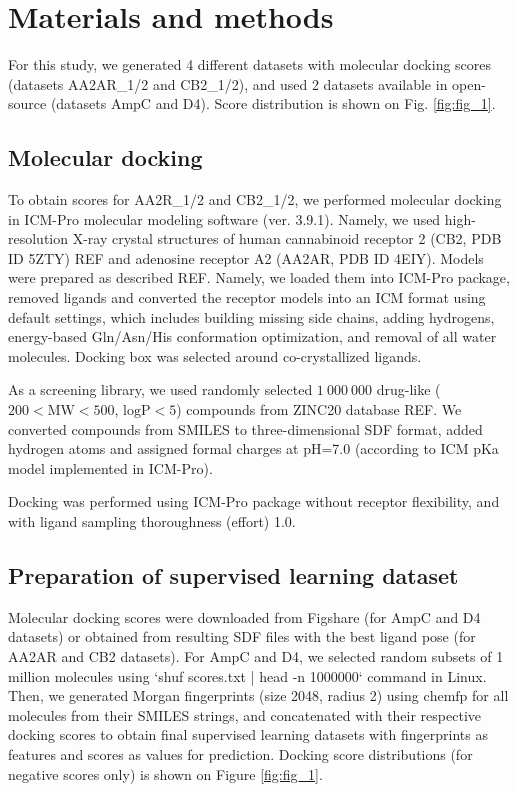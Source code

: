 \section{Materials and methods}
For this study, we generated 4 different datasets with molecular docking scores (datasets AA2AR\_1/2 and CB2\_1/2), and used 2 datasets available in open-source \cite{ultralarge_docking_first} (datasets AmpC and D4). Score distribution is shown on Fig. \ref{fig:fig_1}.

\subsection{Molecular docking}
To obtain scores for AA2R\_1/2 and CB2\_1/2, we performed molecular docking in ICM-Pro molecular modeling software (ver. 3.9.1). Namely, we used high-resolution X-ray crystal structures of human cannabinoid receptor 2 (CB2, PDB ID 5ZTY) REF and adenosine receptor A2 (AA2AR, PDB ID 4EIY). Models were prepared as described REF. Namely, we loaded them into ICM-Pro package, removed ligands and converted the receptor models into an ICM format using default settings, which includes building missing side chains, adding hydrogens, energy-based Gln/Asn/His conformation optimization, and removal of all water molecules. Docking box was selected around co-crystallized ligands.

As a screening library, we used randomly selected $1\ 000\ 000$ drug-like ($200 < \text{MW} < 500$, $\text{logP} < 5$) compounds from ZINC20 database REF. We converted compounds from SMILES to three-dimensional SDF  format, added hydrogen atoms and assigned formal charges at pH=7.0 (according to ICM pKa model implemented in ICM-Pro).

Docking was performed using ICM-Pro package without receptor flexibility, and with ligand sampling thoroughness (effort) 1.0.

\subsection{Preparation of supervised learning dataset}
Molecular docking scores were downloaded from Figshare (for AmpC and D4 datasets) or obtained from resulting SDF files with the best ligand pose (for AA2AR and CB2 datasets). For AmpC and D4, we selected random subsets of 1 million molecules using `shuf scores.txt | head -n 1000000` command in Linux. Then, we generated Morgan fingerprints (size 2048, radius 2) using $\text{chemfp}$ for all molecules from their SMILES strings, and concatenated with their respective docking scores to obtain final supervised learning datasets with fingerprints as features and scores as values for prediction. Docking score distributions (for negative scores only) is shown on Figure \ref{fig:fig_1}.


